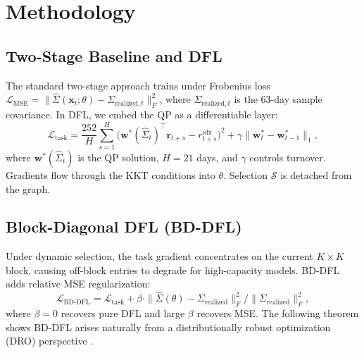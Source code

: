 \documentclass[letterpaper]{article}
\newcommand{\bw}{\mathbf{w}}
\newcommand{\br}{\mathbf{r}}
\newcommand{\bx}{\mathbf{x}}
\newcommand{\bSigma}{\hat{\Sigma}}
\newcommand{\cS}{\mathcal{S}}
\newcommand{\cL}{\mathcal{L}}
\begin{document}
\section{Methodology}

\subsection{Two-Stage Baseline and DFL}

The standard two-stage approach trains under Frobenius loss $\cL_{\text{MSE}} = \|\bSigma(\bx_t; \theta) - \Sigma_{\text{realized},t}\|_F^2$, where $\Sigma_{\text{realized},t}$ is the 63-day sample covariance. In DFL, we embed the QP as a differentiable layer:
\begin{equation}
  \cL_{\text{task}} = \frac{252}{H} \sum_{s=1}^{H} \bigl(\bw^*(\bSigma_t)^\top \br_{t+s} - r_{t+s}^{\text{idx}}\bigr)^2 + \gamma \|\bw^*_t - \bw^*_{t-1}\|_1,
  \label{eq:task}
\end{equation}
where $\bw^*(\bSigma_t)$ is the QP solution, $H = 21$ days, and $\gamma$ controls turnover. Gradients flow through the KKT conditions \citep{amos2017optnet} into $\theta$. Selection $\cS$ is detached from the graph.

\subsection{Block-Diagonal DFL (BD-DFL)}

Under dynamic selection, the task gradient concentrates on the current $K \times K$ block, causing off-block entries to degrade for high-capacity models. BD-DFL adds relative MSE regularization:
\begin{equation}
  \cL_{\text{BD-DFL}} = \cL_{\text{task}} + \beta \cdot \|\bSigma(\theta) - \Sigma_{\text{realized}}\|_F^2 / \|\Sigma_{\text{realized}}\|_F^2,
  \label{eq:bddfl_method}
\end{equation}
where $\beta = 0$ recovers pure DFL and large $\beta$ recovers MSE. The following theorem shows BD-DFL arises naturally from a distributionally robust optimization (DRO) perspective \citep{mohajerin2018data,blanchet2019quantifying}.
\end{document}
